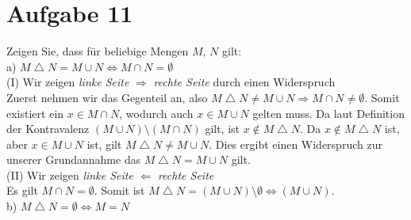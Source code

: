 \section*{Aufgabe 11}

Zeigen Sie, dass für beliebige Mengen $M$, $N$ gilt:\\

a) $M \bigtriangleup N = M \cup N \Leftrightarrow M \cap N = \emptyset$\\

(I) Wir zeigen \textit{linke Seite} $\Rightarrow$ \textit{rechte Seite} durch einen Widerspruch\\

Zuerst nehmen wir das Gegenteil an, also $M \bigtriangleup N \neq M \cup N \Rightarrow M \cap N \neq \emptyset$. Somit existiert ein $x \in M \cap N$, wodurch auch $x \in M \cup N$ gelten muss. Da laut Definition der Kontravalenz $(M \cup N) \setminus (M \cap N)$ gilt, ist $x \not \in M \bigtriangleup N$. Da $x \not \in M \bigtriangleup N$ ist, aber $x \in M \cup N$ ist, gilt $M \bigtriangleup N \neq M \cup N$. Dies ergibt einen Widerspruch zur unserer Grundannahme das $M \bigtriangleup N = M \cup N$ gilt.\\

(II) Wir zeigen \textit{linke Seite} $\Leftarrow$ \textit{rechte Seite}\\

Es gilt $M \cap N = \emptyset$. Somit ist $M \bigtriangleup N = (M \cup N) \setminus \emptyset \Leftrightarrow (M \cup N)$.\\

b) $M \bigtriangleup N = \emptyset \Leftrightarrow M = N$